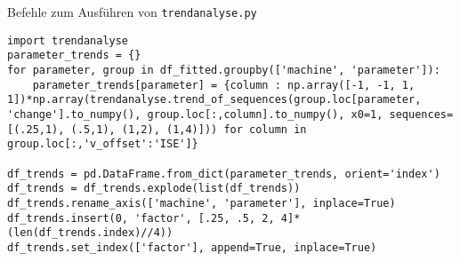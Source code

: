 \begingroup
\captionsetup{type=listing}
\caption{Befehle zum Ausführen von \texttt{trendanalyse.py}\label{lst:TrendanalyseCommand}}
\begin{verbatim}
import trendanalyse
parameter_trends = {}
for parameter, group in df_fitted.groupby(['machine', 'parameter']):
    parameter_trends[parameter] = {column : np.array([-1, -1, 1, 1])*np.array(trendanalyse.trend_of_sequences(group.loc[parameter, 'change'].to_numpy(), group.loc[:,column].to_numpy(), x0=1, sequences=[(.25,1), (.5,1), (1,2), (1,4)])) for column in group.loc[:,'v_offset':'ISE']}

df_trends = pd.DataFrame.from_dict(parameter_trends, orient='index')
df_trends = df_trends.explode(list(df_trends))
df_trends.rename_axis(['machine', 'parameter'], inplace=True)
df_trends.insert(0, 'factor', [.25, .5, 2, 4]*(len(df_trends.index)//4))
df_trends.set_index(['factor'], append=True, inplace=True)
\end{verbatim}
\endgroup